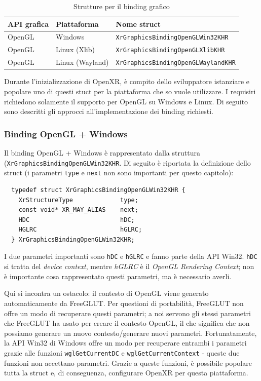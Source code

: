 \documentclass[twoside]{supsistudent}
\begin{document}
\begin{table}[H]
  \caption{Strutture per il binding grafico}
  \begin{center}
    \begin{tabular}{ l l l }
      API grafica & Piattaforma & Nome struct \\
      \hline
      OpenGL      & Windows         & \texttt{XrGraphicsBindingOpenGLWin32KHR} \\
      OpenGL      & Linux (Xlib)    & \texttt{XrGraphicsBindingOpenGLXlibKHR} \\
      OpenGL      & Linux (Wayland) & \texttt{XrGraphicsBindingOpenGLWaylandKHR}
    \end{tabular}
  \end{center}
\end{table}

Durante l'inizializzazione di OpenXR, è compito dello sviluppatore istanziare e popolare uno di questi stuct per la piattaforma che so vuole utilizzare. I requisiri richiedono solamente il supporto per OpenGL su Windows e Linux. Di seguito sono descritti gli approcci all'implementazione dei binding richiesti.

\subsubsection{Binding OpenGL + Windows}

Il binding OpenGL + Windows è rappresentato dalla struttura (\texttt{XrGraphicsBindingOpenGLWin32KHR}. Di seguito è riportata la definizione dello struct (i parametri \texttt{type} e \texttt{next} non sono importanti per questo capitolo):

\begin{verbatim}
  typedef struct XrGraphicsBindingOpenGLWin32KHR {
    XrStructureType             type;
    const void* XR_MAY_ALIAS    next;
    HDC                         hDC;
    HGLRC                       hGLRC;
  } XrGraphicsBindingOpenGLWin32KHR;
\end{verbatim}

I due parametri importanti sono \texttt{hDC} e \texttt{hGLRC} e fanno parte della API Win32. \texttt{hDC} si tratta del \textit{device context}, mentre \textit{hGLRC} è il \textit{OpenGL Rendering Context}; non è importante cosa rappresentato questi parametri, ma è necessario averli.

Qui si incontra un ostacolo: il contesto di OpenGL viene generato automaticamente da FreeGLUT. Per questioni di portabilità, FreeGLUT non offre un modo di recuperare questi parametri; a noi servono gli stessi parametri che FreeGLUT ha usato per creare il contesto OpenGL, il che significa che non possiamo generare un nuovo contesto/generare nuovi parametri. Fortunatamente, la API Win32 di Windows offre un modo per recuperare entrambi i parametri grazie alle funzioni \texttt{wglGetCurrentDC} e \texttt{wglGetCurrentContext} - queste due funzioni non accettano parametri. Grazie a queste funzioni, è possibile popolare tutta la struct e, di conseguenza, configurare OpenXR per questa piattaforma.
\end{document}
